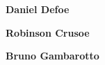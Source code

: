 \textbf{Daniel Defoe} \lipsum[1]

\textbf{Robinson Crusoe} \lipsum[3]

\textbf{Bruno Gambarotto} \lipsum[4]

